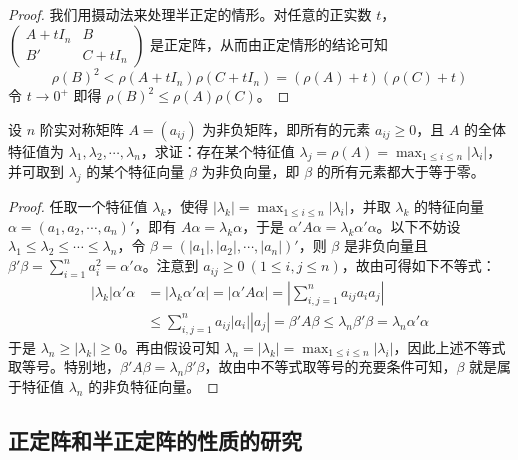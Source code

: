 \documentclass[../../main.tex]{subfiles}%
\begin{document}
\begin{proof}
我们用摄动法来处理半正定的情形。对任意的正实数 \(t\)，\(\begin{pmatrix}
A + tI_n & B \\
B' & C + tI_n
\end{pmatrix}\) 是正定阵，从而由正定情形的结论可知
\[
\rho(B)^2 < \rho(A + tI_n)\rho(C + tI_n) = (\rho(A) + t)(\rho(C) + t)
\]
令 \(t \to 0^{+}\) 即得 \(\rho(B)^2 \leqslant  \rho(A)\rho(C)\)。 

\end{proof}

\begin{proposition}\label{proposition:例9.58}
设 \(n\) 阶实对称矩阵 \(A = (a_{ij})\) 为非负矩阵，即所有的元素 \(a_{ij} \geqslant  0\)，且 \(A\) 的全体特征值为 \(\lambda_1,\lambda_2,\cdots,\lambda_n\)，求证：存在某个特征值 \(\lambda_j = \rho(A) = \max_{1\leqslant  i \leqslant  n}|\lambda_i|\)，并可取到 \(\lambda_j\) 的某个特征向量 \(\beta\) 为非负向量，即 \(\beta\) 的所有元素都大于等于零。
\end{proposition}
\begin{proof}

任取一个特征值 \(\lambda_k\)，使得 \(|\lambda_k| = \max_{1\leqslant  i \leqslant  n}|\lambda_i|\)，并取 \(\lambda_k\) 的特征向量 \(\alpha = (a_1,a_2,\cdots,a_n)'\)，即有 \(A\alpha = \lambda_k\alpha\)，于是 \(\alpha'A\alpha = \lambda_k\alpha'\alpha\)。以下不妨设 \(\lambda_1 \leqslant  \lambda_2 \leqslant  \cdots \leqslant  \lambda_n\)，令 \(\beta = (|a_1|,|a_2|,\cdots,|a_n|)'\)，则 \(\beta\) 是非负向量且 \(\beta'\beta = \sum_{i = 1}^{n}a_i^2 = \alpha'\alpha\)。注意到 \(a_{ij} \geqslant  0\ (1\leqslant  i,j \leqslant  n)\)，故由可得如下不等式：
\begin{align*}
|\lambda_k|\alpha'\alpha &= |\lambda_k\alpha'\alpha| = |\alpha'A\alpha| = \left|\sum_{i,j = 1}^{n}a_{ij}a_ia_j\right|\\
&\leqslant  \sum_{i,j = 1}^{n}a_{ij}|a_i||a_j| = \beta'A\beta \leqslant  \lambda_n\beta'\beta = \lambda_n\alpha'\alpha
\end{align*}
于是 \(\lambda_n \geqslant  |\lambda_k| \geqslant  0\)。再由假设可知 \(\lambda_n = |\lambda_k| = \max_{1\leqslant  i \leqslant  n}|\lambda_i|\)，因此上述不等式取等号。特别地，\(\beta'A\beta = \lambda_n\beta'\beta\)，故由中不等式取等号的充要条件可知，\(\beta\) 就是属于特征值 \(\lambda_n\) 的非负特征向量。 

\end{proof}


\subsection{正定阵和半正定阵的性质的研究}
\end{document}
